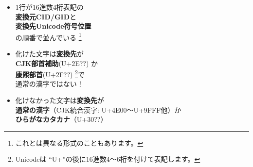 \begin{frame}[fragile]
\begin{multicols}{2}
\begin{tikzpicture}[inner sep=0pt]
    \end{tikzpicture}

    \columnbreak

    \begin{itemize}\scriptsize
    \item 1行が16進数4桁表記の \\
      {\color{green}\bfseries 変換元CID/GID}と \\
      {\bfseries 変換先Unicode符号位置} \\ の順番で並んでいる
      \footnote{\tiny これとは異なる形式のこともあります。}
    \item 化けた文字は{\color{red}\bfseries 変換先}が \\
      {\color{red}\bfseries CJK部首補助}(U+2E??) か \\
      {\color{red}\bfseries 康熙部首}(U+2F??)
      \footnote{\tiny
      Unicodeは
      ``U+''の後に16進数4～6桁を付けて表記します。}で \\
      通常の漢字ではない！
    \item 化けなかった文字は{\color{blue}\bfseries 変換先}が \\
      {\color{blue}\bfseries 通常の漢字}（CJK統合漢字: U+4E00～U+9FFF他）か \\
      {\color{blue}\bfseries ひらがなカタカナ}（U+30??）
    \end{itemize}
  \end{multicols}
\end{frame}

